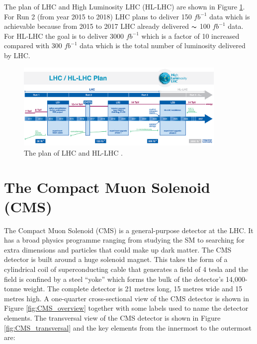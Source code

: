 The plan of LHC and High Luminosity LHC (HL-LHC) are shown in Figure \ref{fig:LHC_plan}. For Run 2 (from year 2015 to 2018) LHC plans to deliver 150 $fb^{-1}$ data which is achievable because from 2015 to 2017 LHC already delivered $\thicksim$ 100 $fb^{-1}$ data. For HL-LHC the goal is to deliver 3000 $fb^{-1}$ which is a factor of 10 increased compared with 300 $fb^{-1}$ data which is the total number of luminosity delivered by LHC.
\begin{figure}[h!]
\begin{center}
\includegraphics[width=0.9\textwidth]{figures/LHC/HL_LHC_PlanUpdateJuly2015.PNG}
\caption{The plan of LHC and HL-LHC \cite{Antonella:1975962}.}
\label{fig:LHC_plan}
\end{center}
\end{figure}


\section{The Compact Muon Solenoid (CMS)}\label{sec:CMS}
The Compact Muon Solenoid (CMS) is a general-purpose detector at the LHC. It has a broad physics programme ranging from studying the SM to searching for extra dimensions and particles that could make up dark matter. The CMS detector is built around a huge solenoid magnet. This takes the form of a cylindrical coil of superconducting cable that generates a field of 4 tesla and the field is confined by a steel ``yoke'' which forms the bulk of the detector's 14,000-tonne weight. The complete detector is 21 metres long, 15 metres wide and 15 metres high. A one-quarter cross-sectional view of the CMS detector is shown in Figure \ref{fig:CMS_overview} together with some labels used to name the
detector elements. The transversal view of the CMS detector is shown in Figure \ref{fig:CMS_transversal} and the key elements from the innermost to the outermost are:


